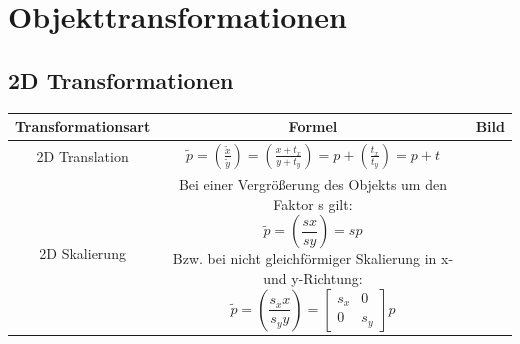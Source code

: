 \documentclass{scrartcl}
\begin{document}
\section{Objekttransformationen}

\subsection{2D Transformationen}

\begin{tabular}{|c|c|c|}
	\hline Transformationsart & Formel & Bild \\ 
	\hline 2D Translation & \parbox[c][4cm]{6cm}{$\widetilde{p} = (\frac{\widetilde{x}}{\widetilde{y}}) = (\frac{x + t_x}{y + t_y}) = p + (\frac{t_x}{t_y}) = p + t$} &  \\ 
	\hline 2D Skalierung & \parbox[c][6cm]{6cm}{Bei einer Vergrößerung des Objekts um den Faktor s gilt:
	\begin{equation}
		\widetilde{p} = (\frac{sx}{sy}) = sp
	\end{equation}
	Bzw. bei nicht gleichförmiger Skalierung in x- und y-Richtung:
	\begin{equation}
		\widetilde{p} = (\frac{s_x x}{s_y y}) = \begin{bmatrix}
	s_x & 0 \\
	0 & s_y
	\end{bmatrix}p
	\end{equation}		
	} &  \\

\end{tabular}
\end{document}
